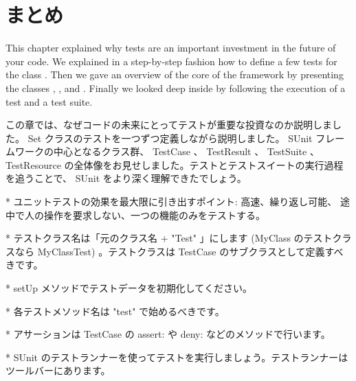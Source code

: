\documentclass[a4paper,10pt,twoside]{book}
\begin{document}
{{%



\section{まとめ}

This chapter explained why tests are an important investment in 
the future of your code.  
We explained in a step-by-step fashion how
to define a few tests for the class .
Then we gave an overview of the core of the \sunit framework by presenting
the classes , , 
and .  Finally we looked deep inside \sunit by
following the execution of a test and a test suite.
\fi

この章では、なぜコードの未来にとってテストが重要な投資なのか説明しました。 Set クラスのテストを一つずつ定義しながら説明しました。 SUnit フレームワークの中心となるクラス群、 TestCase 、 TestResult 、 TestSuite 、 TestResource の全体像をお見せしました。テストとテストスイートの実行過程を追うことで、 SUnit をより深く理解できたでしょう。

* ユニットテストの効果を最大限に引き出すポイント: 高速、繰り返し可能、 途中で人の操作を要求しない、一つの機能のみをテストする。

* テストクラス名は「元のクラス名 + "Test" 」にします (MyClass のテストクラスなら MyClassTest) 。テストクラスは TestCase のサブクラスとして定義すべきです。

* setUp メソッドでテストデータを初期化してください。

* 各テストメソッド名は "test" で始めるべきです。

* アサーションは TestCase の assert: や deny: などのメソッドで行います。

* SUnit のテストランナーを使ってテストを実行しましょう。テストランナーはツールバーにあります。
\fi

}}
\end{document}
